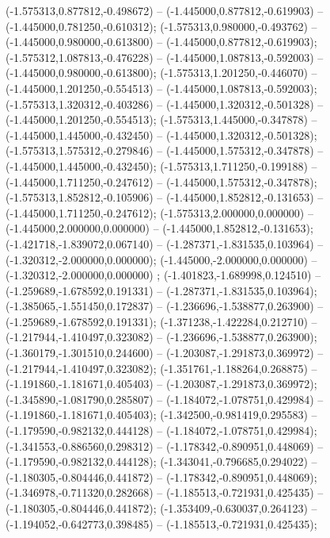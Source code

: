  (-1.575313,0.877812,-0.498672) -- (-1.445000,0.877812,-0.619903) -- (-1.445000,0.781250,-0.610312);
 (-1.575313,0.980000,-0.493762) -- (-1.445000,0.980000,-0.613800) -- (-1.445000,0.877812,-0.619903);
 (-1.575312,1.087813,-0.476228) -- (-1.445000,1.087813,-0.592003) -- (-1.445000,0.980000,-0.613800);
 (-1.575313,1.201250,-0.446070) -- (-1.445000,1.201250,-0.554513) -- (-1.445000,1.087813,-0.592003);
 (-1.575313,1.320312,-0.403286) -- (-1.445000,1.320312,-0.501328) -- (-1.445000,1.201250,-0.554513);
 (-1.575313,1.445000,-0.347878) -- (-1.445000,1.445000,-0.432450) -- (-1.445000,1.320312,-0.501328);
 (-1.575313,1.575312,-0.279846) -- (-1.445000,1.575312,-0.347878) -- (-1.445000,1.445000,-0.432450);
 (-1.575313,1.711250,-0.199188) -- (-1.445000,1.711250,-0.247612) -- (-1.445000,1.575312,-0.347878);
 (-1.575313,1.852812,-0.105906) -- (-1.445000,1.852812,-0.131653) -- (-1.445000,1.711250,-0.247612);
 (-1.575313,2.000000,0.000000) -- (-1.445000,2.000000,0.000000) -- (-1.445000,1.852812,-0.131653);
 (-1.421718,-1.839072,0.067140) -- (-1.287371,-1.831535,0.103964) -- (-1.320312,-2.000000,0.000000);
 (-1.445000,-2.000000,0.000000) -- (-1.320312,-2.000000,0.000000) ;
 (-1.401823,-1.689998,0.124510) -- (-1.259689,-1.678592,0.191331) -- (-1.287371,-1.831535,0.103964);
 (-1.385065,-1.551450,0.172837) -- (-1.236696,-1.538877,0.263900) -- (-1.259689,-1.678592,0.191331);
 (-1.371238,-1.422284,0.212710) -- (-1.217944,-1.410497,0.323082) -- (-1.236696,-1.538877,0.263900);
 (-1.360179,-1.301510,0.244600) -- (-1.203087,-1.291873,0.369972) -- (-1.217944,-1.410497,0.323082);
 (-1.351761,-1.188264,0.268875) -- (-1.191860,-1.181671,0.405403) -- (-1.203087,-1.291873,0.369972);
 (-1.345890,-1.081790,0.285807) -- (-1.184072,-1.078751,0.429984) -- (-1.191860,-1.181671,0.405403);
 (-1.342500,-0.981419,0.295583) -- (-1.179590,-0.982132,0.444128) -- (-1.184072,-1.078751,0.429984);
 (-1.341553,-0.886560,0.298312) -- (-1.178342,-0.890951,0.448069) -- (-1.179590,-0.982132,0.444128);
 (-1.343041,-0.796685,0.294022) -- (-1.180305,-0.804446,0.441872) -- (-1.178342,-0.890951,0.448069);
 (-1.346978,-0.711320,0.282668) -- (-1.185513,-0.721931,0.425435) -- (-1.180305,-0.804446,0.441872);
 (-1.353409,-0.630037,0.264123) -- (-1.194052,-0.642773,0.398485) -- (-1.185513,-0.721931,0.425435);
